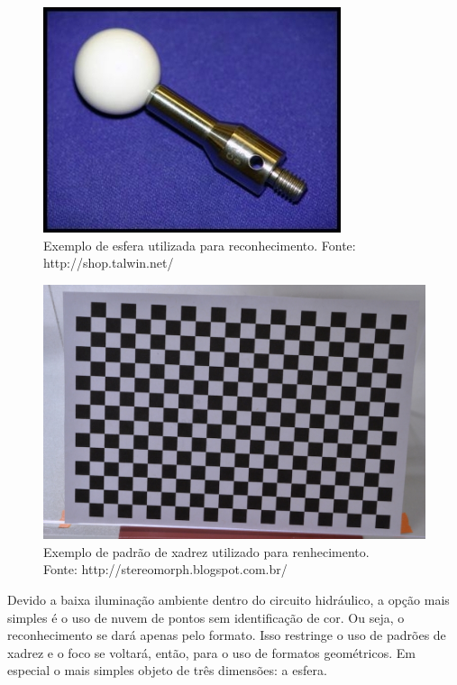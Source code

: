 \begin{figure}[h!]
   \centering
   \includegraphics[width=0.95\columnwidth]{figs/calibracao/sphere_rec}
   \caption{Exemplo de esfera utilizada para reconhecimento. Fonte:
   http://shop.talwin.net/}
   \label{fig::sphere_rec}
\end{figure}



\begin{figure}[h!]
   \centering
   \includegraphics[width=0.95\columnwidth]{figs/calibracao/checkerboard_rec}
   \caption{Exemplo de padrão de xadrez utilizado para renhecimento.\\ Fonte:
   http://stereomorph.blogspot.com.br/}
   \label{fig::checkerboard_rec}
\end{figure}


Devido a baixa iluminação ambiente dentro do circuito hidráulico, a opção
mais simples é o uso de nuvem de pontos sem identificação de cor. Ou seja, o
reconhecimento se dará apenas pelo formato. Isso restringe o uso de padrões de
xadrez e o foco se voltará, então, para o uso de formatos geométricos. Em
especial o mais simples objeto de três dimensões: a esfera.

